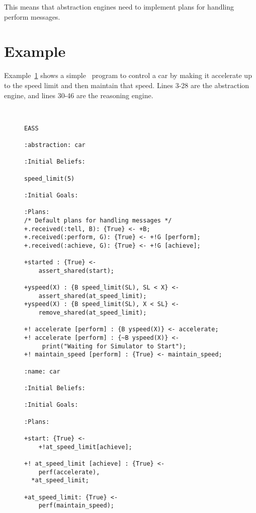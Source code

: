 This means that abstraction engines need to implement plans for
handling perform messages. 

\section{Example}
Example~\ref{code:EASSexample} shows a simple \eass\ program to
control a car by making it accelerate up to the speed limit and then
maintain that speed.  Lines 3-28 are the abstraction engine, and lines
30-46 are the reasoning engine. 

\begin{figure}[!htbp]
\begin{ourexample}
\label{code:EASSexample} \quad \\
\begin{lstlisting}[basicstyle=\sffamily,style=easslisting,language=Gwendolen]
EASS

:abstraction: car

:Initial Beliefs:

speed_limit(5)
											
:Initial Goals:
		
:Plans: 
/* Default plans for handling messages */
+.received(:tell, B): {True} <- +B;   
+.received(:perform, G): {True} <- +!G [perform];
+.received(:achieve, G): {True} <- +!G [achieve];

+started : {True} <-
	assert_shared(start);

+yspeed(X) : {B speed_limit(SL), SL < X} <-
	assert_shared(at_speed_limit);
+yspeed(X) : {B speed_limit(SL), X < SL} <-
	remove_shared(at_speed_limit);
	
+! accelerate [perform] : {B yspeed(X)} <- accelerate;
+! accelerate [perform] : {~B yspeed(X)} <- 
     print("Waiting for Simulator to Start");
+! maintain_speed [perform] : {True} <- maintain_speed;

:name: car
			
:Initial Beliefs:
													
:Initial Goals:
		
:Plans: 

+start: {True} <-
	+!at_speed_limit[achieve];

+! at_speed_limit [achieve] : {True} <-
	perf(accelerate),
  *at_speed_limit;

+at_speed_limit: {True} <-
	perf(maintain_speed);
\end{lstlisting}
\end{ourexample}
\end{figure}

